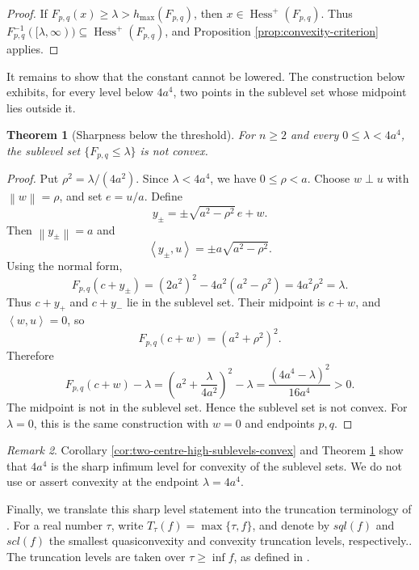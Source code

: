 \documentclass[11pt]{amsart}
\newtheorem{theorem}{Theorem}[section]
\theoremstyle{remark}
\newtheorem{remark}[theorem]{Remark}
\newcommand{\Hessp}{\operatorname{Hess}^{+}}
\newcommand{\ip}[2]{\left\langle #1,#2\right\rangle}
\newcommand{\norm}[1]{\left\lVert #1\right\rVert}
\begin{document}
\begin{proof}
If $F_{p,q}(x)\ge\lambda>h_{\max}(F_{p,q})$, then $x\in\Hessp(F_{p,q})$.
Thus $F_{p,q}^{-1}([\lambda,\infty))\subseteq\Hessp(F_{p,q})$, and
Proposition \ref{prop:convexity-criterion} applies.
\end{proof}

It remains to show that the constant cannot be lowered.  The construction
below exhibits, for every level below \(4a^4\), two points in the sublevel
set whose midpoint lies outside it.

\begin{theorem}[Sharpness below the threshold]\label{thm:two-centre-sharpness}
For $n\ge2$ and every $0\le\lambda<4a^4$, the sublevel set
$\{F_{p,q}\le\lambda\}$ is not convex.
\end{theorem}

\begin{proof}
Put $\rho^2=\lambda/(4a^2)$. Since $\lambda<4a^4$, we have $0\le\rho<a$.
Choose $w\perp u$ with $\norm{w}=\rho$, and set $e=u/a$. Define
\[
 y_\pm=\pm\sqrt{a^2-\rho^2}\,e+w.
\]
Then $\norm{y_\pm}=a$ and
\[
 \ip{y_\pm}{u}=\pm a\sqrt{a^2-\rho^2}.
\]
Using the normal form,
\[
 F_{p,q}(c+y_\pm)
 =(2a^2)^2-4a^2(a^2-\rho^2)
 =4a^2\rho^2
 =\lambda.
\]
Thus $c+y_+$ and $c+y_-$ lie in the sublevel set. Their midpoint is $c+w$,
and $\ip{w}{u}=0$, so
\[
 F_{p,q}(c+w)=(a^2+\rho^2)^2.
\]
Therefore
\[
 F_{p,q}(c+w)-\lambda
 =\left(a^2+\frac{\lambda}{4a^2}\right)^2-\lambda
 =\frac{(4a^4-\lambda)^2}{16a^4}>0.
\]
The midpoint is not in the sublevel set. Hence the sublevel set is not convex.
For $\lambda=0$, this is the same construction with $w=0$ and endpoints
$p,q$.
\end{proof}

\begin{remark}
Corollary \ref{cor:two-centre-high-sublevels-convex} and Theorem
\ref{thm:two-centre-sharpness} show that $4a^4$ is the sharp infimum level for
convexity of the sublevel sets. We do not use or assert convexity at the
endpoint $\lambda=4a^4$.
\end{remark}

Finally, we translate this sharp level statement into the truncation
terminology of \cite{Pintea2026Cqt}.  For a real number \(\tau\), write
\(T_\tau(f)=\max\{\tau,f\}\), and denote by \(sql(f)\) and \(scl(f)\) the
smallest quasiconvexity and convexity truncation levels, respectively.. The truncation levels are taken over
$\tau\ge\inf f$, as defined in \cite[Section 2]{Pintea2026Cqt}.
\end{document}
